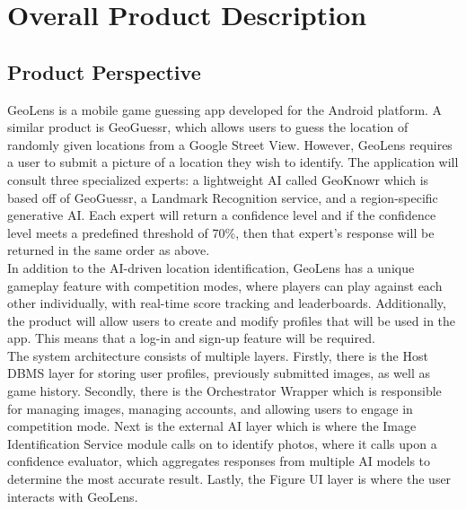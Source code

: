 \documentclass[]{article}
\begin{document}

\section{Overall Product Description}
\label{sec:overall_description}



\subsection{Product Perspective}
\label{sub:product_perspective}

\noindent GeoLens is a mobile game guessing app developed for the Android platform. A similar product is GeoGuessr, which allows users to guess the location of randomly given locations from a Google Street View. However, GeoLens requires a user to submit a picture of a location they wish to identify. The application will consult three specialized experts: a lightweight AI called GeoKnowr which is based off of GeoGuessr, a Landmark Recognition service, and a region-specific generative AI. Each expert will return a confidence level and if the confidence level meets a predefined threshold of 70\%, then that expert's response will be returned in the same order as above.\\

\noindent In addition to the AI-driven location identification, GeoLens has a unique gameplay feature with competition modes, where players can play against each other individually, with real-time score tracking and leaderboards. Additionally, the product will allow users to create and modify profiles that will be used in the app. This means that a log-in and sign-up feature will be required.\\

\noindent The system architecture consists of multiple layers. Firstly, there is the Host DBMS layer for storing user profiles, previously submitted images, as well as game history. Secondly, there is the Orchestrator Wrapper which is responsible for managing images, managing accounts, and allowing users to engage in competition mode. Next is the external AI layer which is where the Image Identification Service module calls on to identify photos, where it calls upon a confidence evaluator, which aggregates responses from multiple AI models to determine the most accurate result. Lastly, the Figure UI layer is where the user interacts with GeoLens.\\
\end{document}
